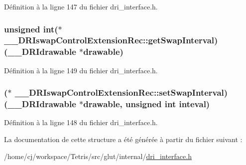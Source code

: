 Définition à la ligne 147 du fichier dri\-\_\-interface.\-h.

\hypertarget{struct_____d_r_iswap_control_extension_rec_a10c8d65ba5f6416c2f5b015d5cedd143}{
\subsubsection[{get\-Swap\-Interval}]{\setlength{\rightskip}{0pt plus 5cm}unsigned int($\ast$ \-\_\-\-\_\-\-D\-R\-Iswap\-Control\-Extension\-Rec\-::get\-Swap\-Interval)({\bf \-\_\-\-\_\-\-D\-R\-Idrawable} $\ast$drawable)}}\label{struct_____d_r_iswap_control_extension_rec_a10c8d65ba5f6416c2f5b015d5cedd143}


Définition à la ligne 149 du fichier dri\-\_\-interface.\-h.

\hypertarget{struct_____d_r_iswap_control_extension_rec_a31f1e571fcbb13be8720ad03645ecaa0}{
\subsubsection[{set\-Swap\-Interval}]{($\ast$ \-\_\-\-\_\-\-D\-R\-Iswap\-Control\-Extension\-Rec\-::set\-Swap\-Interval)({\bf \-\_\-\-\_\-\-D\-R\-Idrawable} $\ast$drawable, unsigned int inteval)}}\label{struct_____d_r_iswap_control_extension_rec_a31f1e571fcbb13be8720ad03645ecaa0}


Définition à la ligne 148 du fichier dri\-\_\-interface.\-h.



La documentation de cette structure a été générée à partir du fichier suivant \-:\begin{DoxyCompactItemize}
\item 
/home/cj/workspace/\-Tetris/src/glut/internal/\hyperlink{dri__interface_8h}{dri\-\_\-interface.\-h}\end{DoxyCompactItemize}
